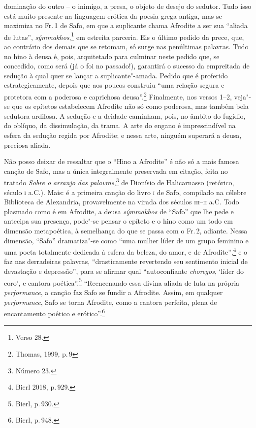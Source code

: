{dominação do outro -- o inimigo, a presa, o objeto de desejo do sedutor. Tudo
isso está muito presente na linguagem erótica da poesia grega antiga, mas se
maximiza no Fr.\,1 de Safo, em que a suplicante chama Afrodite a ser sua
``aliada de lutas'', \textit{sýmmakhos},\footnote{Verso 28.} em estreita parceria. Eis o último pedido da prece, que, ao contrário dos demais que se retomam, só surge nas penúltimas palavras. Tudo no hino à deusa é, pois, arquitetado para culminar neste pedido que, se concedido, como será (já o foi no passado!), garantirá o sucesso da empreitada de sedução à qual quer se lançar a suplicante"-amada. Pedido que é proferido estrategicamente, depois que aos poucos construiu ``uma relação segura e protetora com a poderosa e caprichosa deusa''.\footnote{Thomas, 1999, p.\,9} Finalmente, nos versos 1--2, veja"-se
que os epítetos estabelecem Afrodite não só como poderosa, mas também bela
sedutora ardilosa. A sedução e a deidade caminham, pois, no âmbito do fugidio,
do oblíquo, da dissimulação, da trama. A arte do engano é imprescindível na
esfera da sedução regida por Afrodite; e nessa arte, ninguém superará a deusa,
preciosa aliada.

Não posso deixar de ressaltar que o ``Hino a Afrodite'' é não só
a mais famosa canção de Safo, mas a única integralmente preservada em citação, feita no tratado \textit{Sobre o arranjo das palavras},\footnote{Número 23.} de Dionísio de Halicarnasso (retórico, século \textsc{i} a.C.). Mais: é a primeira canção do livro \textsc{i} de Safo,
compilado na célebre Biblioteca de Alexandria, provavelmente na virada dos
séculos \textsc{iii}--\textsc{ii} a.C.
Todo plasmado como é em Afrodite, a deusa \textit{sýmmakhos} de ``Safo'' que lhe pede e antecipa sua presença, pode"-se pensar o epíteto e o hino como um todo em dimensão metapoética, à semelhança do que se passa com o Fr.\,2, adiante. Nessa dimensão, ``Safo'' dramatiza"-se como ``uma mulher líder de um grupo feminino e uma poeta totalmente dedicada à esfera da beleza, do amor, e de Afrodite'',\footnote{Bierl 2018, p.\,929.} e o faz nas derradeiras palavras, ``drasticamente revertendo seu sentimento inicial de devastação e depressão'', para se afirmar qual ``autoconfiante \textit{choregos}, ‘líder do coro’, e cantora poética''.\footnote{Bierl, p.\,930.} ``Reencenando essa divina aliada de luta na própria \textit{performance}, a canção faz Safo se fundir a Afrodite. Assim, em qualquer \textit{performance}, Safo se torna Afrodite, como a cantora perfeita, plena de encantamento poético e erótico''.\footnote{Bierl, p.\,948.}}

